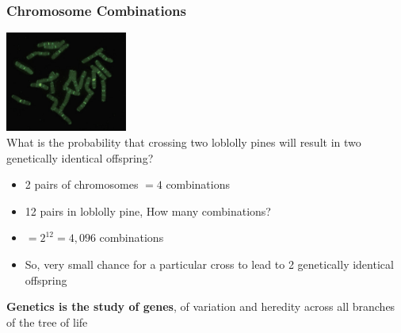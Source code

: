\documentclass{beamer}
\begin{document}
\begin{frame}

\begin{center}
\frametitle{Chromosome Combinations}
			\includegraphics[keepaspectratio, width  =0.3\textwidth]{img/loblollyChroms}\\
			
What is the probability that crossing two loblolly pines will result in two genetically identical offspring?
\end{center}
\begin{itemize}
	\item 2 pairs of chromosomes  $= 4$ combinations 
	\item 12 pairs in loblolly pine, How many combinations?\pause 
	\item $= 2^{12} = 4,096$ combinations
	\item So, very small chance for a particular cross to lead to 2 genetically identical offspring 
\end{itemize}


\end{frame}



\begin{frame}	

	\Large \textbf{Genetics is the study of genes}, of variation and heredity across all branches of the tree of life	
	
	
\end{frame}
\end{document}
